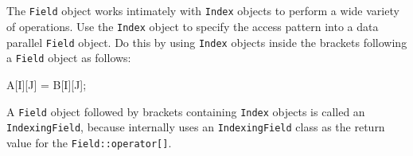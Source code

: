\subsection{} \label{sec:index_fields}

The \texttt{Field} object works intimately with \texttt{Index} objects to perform a wide variety of operations. Use the \texttt{Index} object to specify the access pattern into a data parallel \texttt{Field} object. Do this by using \texttt{Index} objects inside the brackets following a \texttt{Field} object as follows:
\begin{smallcode}
A[I][J] = B[I][J];
\end{smallcode}
A \texttt{Field} object followed by brackets containing \texttt{Index} objects is called an \texttt{IndexingField}, because \ippl internally uses an \texttt{IndexingField} class as the return value for the \texttt{Field::operator[]}.

